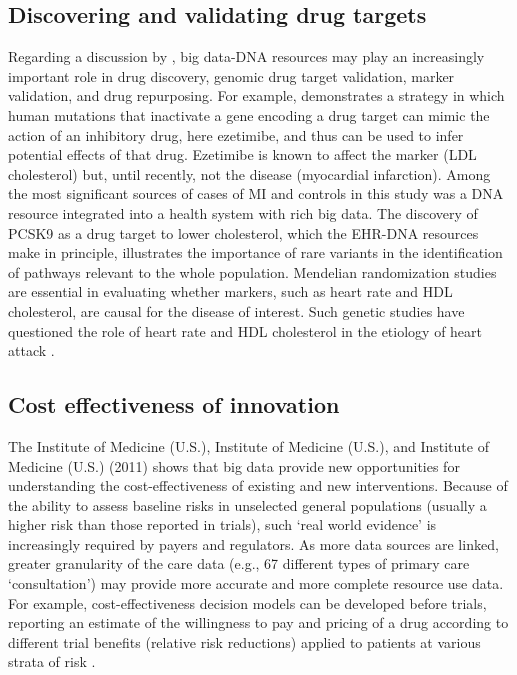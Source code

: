 \documentclass[sigconf]{acmart}
\begin{document}
\subsection{Discovering and validating drug targets}
Regarding a discussion by \cite{rajkumar2010diagnosis}, big data-DNA resources may play an increasingly important role in drug discovery, genomic drug target validation, marker validation, and drug repurposing.
For example, \cite{rajkumar2010diagnosis} demonstrates a strategy in which human mutations that inactivate a gene encoding a drug target can mimic the action of an inhibitory drug, here ezetimibe, and thus can be used to infer potential effects of that drug.
 Ezetimibe is known to affect the marker (LDL cholesterol) but, until recently, not the disease (myocardial infarction).
Among the most significant sources of cases of MI and controls in this study was a DNA resource integrated into a health system with rich big data.  The discovery of PCSK9 as a drug target to lower cholesterol, which the EHR-DNA resources make in principle, illustrates the importance of rare variants in the identification of pathways relevant to the whole population.
Mendelian randomization studies are essential in evaluating whether markers, such as heart rate and HDL cholesterol, are causal for the disease of interest.
Such genetic studies have questioned the role of heart rate and HDL cholesterol in the etiology of heart attack \cite{Wijeysunderae000731}.

\subsection{Cost effectiveness of innovation}
The Institute of Medicine (U.S.), Institute of Medicine (U.S.), and Institute of Medicine (U.S.) (2011) shows that big data provide new opportunities for understanding the cost-effectiveness of existing and new interventions.
Because of the ability to assess baseline risks in unselected general populations (usually a higher risk than those reported in trials), such `real world evidence' is increasingly required by payers and regulators.
As more data sources are linked, greater granularity of the care data (e.g., 67 different types of primary care `consultation') may provide more accurate and more complete resource use data.
For example, cost-effectiveness decision models can be developed before trials, reporting an estimate of the willingness to pay and pricing of a drug according to different trial benefits (relative risk reductions) applied to patients at various strata of risk \cite{breiman2001random}.
\end{document}
